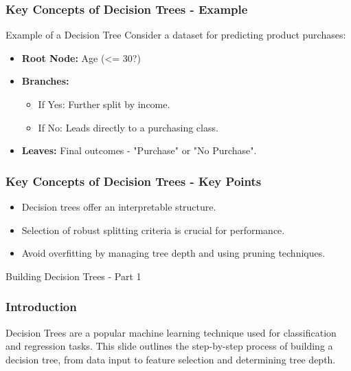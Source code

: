\documentclass[aspectratio=169]{beamer}
\begin{document}
\begin{frame}[fragile]
    \frametitle{Key Concepts of Decision Trees - Example}
    \begin{block}{Example of a Decision Tree}
        Consider a dataset for predicting product purchases:
        \begin{itemize}
            \item \textbf{Root Node:} Age (<= 30?)
            \item \textbf{Branches:}
            \begin{itemize}
                \item If Yes: Further split by income.
                \item If No: Leads directly to a purchasing class.
            \end{itemize}
            \item \textbf{Leaves:} Final outcomes - "Purchase" or "No Purchase".
        \end{itemize}
    \end{block}
\end{frame}

\begin{frame}[fragile]
    \frametitle{Key Concepts of Decision Trees - Key Points}
    \begin{itemize}
        \item Decision trees offer an interpretable structure.
        \item Selection of robust splitting criteria is crucial for performance.
        \item Avoid overfitting by managing tree depth and using pruning techniques.
    \end{itemize}
\end{frame}

\begin{frame}[fragile]{Building Decision Trees - Part 1}
    \frametitle{Introduction}
    Decision Trees are a popular machine learning technique used for classification and regression tasks. 
    This slide outlines the step-by-step process of building a decision tree, from data input to feature selection and determining tree depth.
\end{frame}
\end{document}

